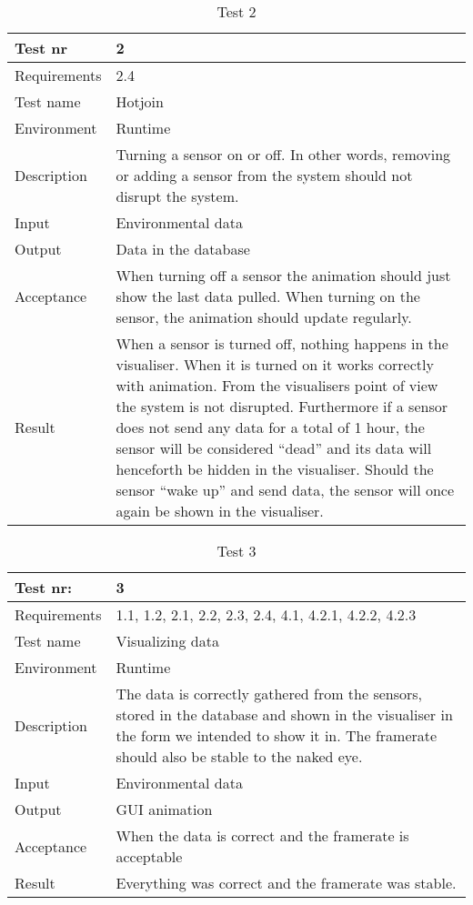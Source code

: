 \documentclass[../document]{subfiles}
\begin{document}
\begin{table}[H]
\caption{Test 2}
\centering
\begin{tabularx}{\textwidth}{|l|X|}
	\hline
	Test nr
	&2
	\\ \hline Requirements
	&2.4
	\\ \hline Test name
	&Hotjoin
	\\ \hline Environment
	&Runtime
	\\ \hline Description
	&Turning a sensor on or off. In other words, removing or adding a sensor from the system should not disrupt the system.
	\\ \hline Input
	&Environmental data
	\\ \hline Output
	&Data in the database
	\\ \hline Acceptance
	&When turning off a sensor the animation should just show the last data pulled. When turning on the sensor, the animation should update regularly.
	\\ \hline Result
	&When a sensor is turned off, nothing happens in the visualiser. When it is turned on it works correctly with animation. From the visualisers point of view the system is not disrupted. Furthermore if a sensor does not send any data for a total of 1 hour, the sensor will be considered “dead” and its data will henceforth be hidden in the visualiser. Should the sensor “wake up” and send data, the sensor will once again be shown in the visualiser.
	\\ \hline 
\end{tabularx}
\end{table}

\begin{table}[H]
\caption{Test 3}
\centering
\begin{tabularx}{\textwidth}{|l|X|}
	\hline
	Test nr:
	&3
	\\ \hline Requirements
	&1.1, 1.2, 2.1, 2.2, 2.3, 2.4, 4.1, 4.2.1, 4.2.2, 4.2.3
	\\ \hline Test name
	&Visualizing data
	\\ \hline Environment
	&Runtime
	\\ \hline Description
	&The data is correctly gathered from the sensors, stored in the database and shown in the visualiser in the form we intended to show it in. The framerate should also be stable to the naked eye.
	\\ \hline Input
	&Environmental data
	\\ \hline Output
	&GUI animation
	\\ \hline Acceptance
	&When the data is correct and the framerate is acceptable
	\\ \hline Result
	&Everything was correct and the framerate was stable.
	\\ \hline 
\end{tabularx}
\end{table}
\end{document}
